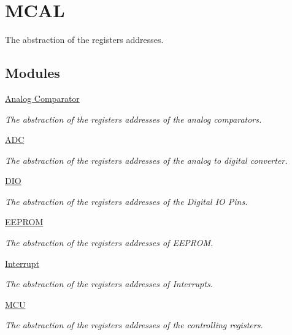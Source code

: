 \hypertarget{group__MCAL}{\section{M\+C\+A\+L}
\label{group__MCAL}
}


The abstraction of the registers addresses.  


\subsection*{Modules}
\begin{DoxyCompactItemize}
\item 
\hyperlink{group__ACMCAL}{Analog Comparator}
\begin{DoxyCompactList}\small\item\em The abstraction of the registers addresses of the analog comparators. \end{DoxyCompactList}\item 
\hyperlink{group__ADCMCAL}{A\+D\+C}
\begin{DoxyCompactList}\small\item\em The abstraction of the registers addresses of the analog to digital converter. \end{DoxyCompactList}\item 
\hyperlink{group__DIOMCAL}{D\+I\+O}
\begin{DoxyCompactList}\small\item\em The abstraction of the registers addresses of the Digital I\+O Pins. \end{DoxyCompactList}\item 
\hyperlink{group__EEPROMMCAL}{E\+E\+P\+R\+O\+M}
\begin{DoxyCompactList}\small\item\em The abstraction of the registers addresses of E\+E\+P\+R\+O\+M. \end{DoxyCompactList}\item 
\hyperlink{group__INTERRUPTMCAL}{Interrupt}
\begin{DoxyCompactList}\small\item\em The abstraction of the registers addresses of Interrupts. \end{DoxyCompactList}\item 
\hyperlink{group__MCUMCAL}{M\+C\+U}
\begin{DoxyCompactList}\small\item\em The abstraction of the registers addresses of the controlling registers. \end{DoxyCompactList}\item 

\end{DoxyCompactItemize}
